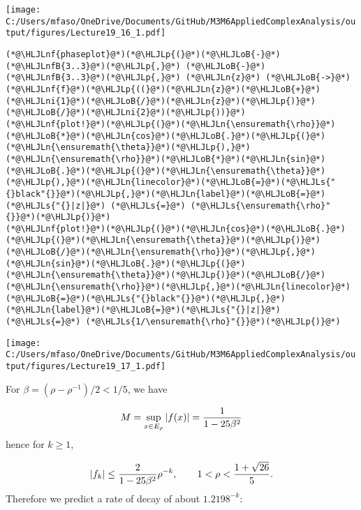 \documentclass[12pt,a4paper]{article}
\newcommand{\HLJLn}[1]{#1}
\newcommand{\HLJLnf}[1]{\textcolor[RGB]{66,102,213}{#1}}
\newcommand{\HLJLs}[1]{\textcolor[RGB]{201,61,57}{#1}}
\newcommand{\HLJLnfB}[1]{\textcolor[RGB]{59,151,46}{#1}}
\newcommand{\HLJLni}[1]{\textcolor[RGB]{59,151,46}{#1}}
\newcommand{\HLJLoB}[1]{\textcolor[RGB]{102,102,102}{\textbf{#1}}}
\newcommand{\HLJLp}[1]{#1}
\begin{document}
\texttt{[image: C:/Users/mfaso/OneDrive/Documents/GitHub/M3M6AppliedComplexAnalysis/output/figures/Lecture19\_16\_1.pdf]}

\begin{lstlisting}
(*@\HLJLnf{phaseplot}@*)(*@\HLJLp{(}@*)(*@\HLJLoB{-}@*)(*@\HLJLnfB{3..3}@*)(*@\HLJLp{,}@*) (*@\HLJLoB{-}@*)(*@\HLJLnfB{3..3}@*)(*@\HLJLp{,}@*) (*@\HLJLn{z}@*) (*@\HLJLoB{->}@*) (*@\HLJLnf{f}@*)(*@\HLJLp{((}@*)(*@\HLJLn{z}@*)(*@\HLJLoB{+}@*)(*@\HLJLni{1}@*)(*@\HLJLoB{/}@*)(*@\HLJLn{z}@*)(*@\HLJLp{)}@*)(*@\HLJLoB{/}@*)(*@\HLJLni{2}@*)(*@\HLJLp{))}@*)
(*@\HLJLnf{plot!}@*)(*@\HLJLp{(}@*)(*@\HLJLn{\ensuremath{\rho}}@*)(*@\HLJLoB{*}@*)(*@\HLJLn{cos}@*)(*@\HLJLoB{.}@*)(*@\HLJLp{(}@*)(*@\HLJLn{\ensuremath{\theta}}@*)(*@\HLJLp{),}@*)(*@\HLJLn{\ensuremath{\rho}}@*)(*@\HLJLoB{*}@*)(*@\HLJLn{sin}@*)(*@\HLJLoB{.}@*)(*@\HLJLp{(}@*)(*@\HLJLn{\ensuremath{\theta}}@*)(*@\HLJLp{),}@*)(*@\HLJLn{linecolor}@*)(*@\HLJLoB{=}@*)(*@\HLJLs{"{}black"{}}@*)(*@\HLJLp{,}@*)(*@\HLJLn{label}@*)(*@\HLJLoB{=}@*)(*@\HLJLs{"{}|z|}@*) (*@\HLJLs{=}@*) (*@\HLJLs{\ensuremath{\rho}"{}}@*)(*@\HLJLp{)}@*)
(*@\HLJLnf{plot!}@*)(*@\HLJLp{(}@*)(*@\HLJLn{cos}@*)(*@\HLJLoB{.}@*)(*@\HLJLp{(}@*)(*@\HLJLn{\ensuremath{\theta}}@*)(*@\HLJLp{)}@*)(*@\HLJLoB{/}@*)(*@\HLJLn{\ensuremath{\rho}}@*)(*@\HLJLp{,}@*)(*@\HLJLn{sin}@*)(*@\HLJLoB{.}@*)(*@\HLJLp{(}@*)(*@\HLJLn{\ensuremath{\theta}}@*)(*@\HLJLp{)}@*)(*@\HLJLoB{/}@*)(*@\HLJLn{\ensuremath{\rho}}@*)(*@\HLJLp{,}@*)(*@\HLJLn{linecolor}@*)(*@\HLJLoB{=}@*)(*@\HLJLs{"{}black"{}}@*)(*@\HLJLp{,}@*)(*@\HLJLn{label}@*)(*@\HLJLoB{=}@*)(*@\HLJLs{"{}|z|}@*) (*@\HLJLs{=}@*) (*@\HLJLs{1/\ensuremath{\rho}"{}}@*)(*@\HLJLp{)}@*)
\end{lstlisting}

\texttt{[image: C:/Users/mfaso/OneDrive/Documents/GitHub/M3M6AppliedComplexAnalysis/output/figures/Lecture19\_17\_1.pdf]}

For $\beta = (\rho - \rho^{-1})/2 < 1/5$, we have

\[
M =  \sup_{x \in  E_{\rho}} |f(x)| = {1 \over 1 - 25 \beta^2}
\]
hence for $k \geq 1$,

\[
\vert f_k \vert \leq {2 \over   1 - 25 \beta^2} \rho^{-k}, \qquad 1 < \rho <  { 1 + \sqrt{26} \over 5 }.
\]
Therefore we predict a rate of decay of about $1.2198^{-k}$:
\end{document}
